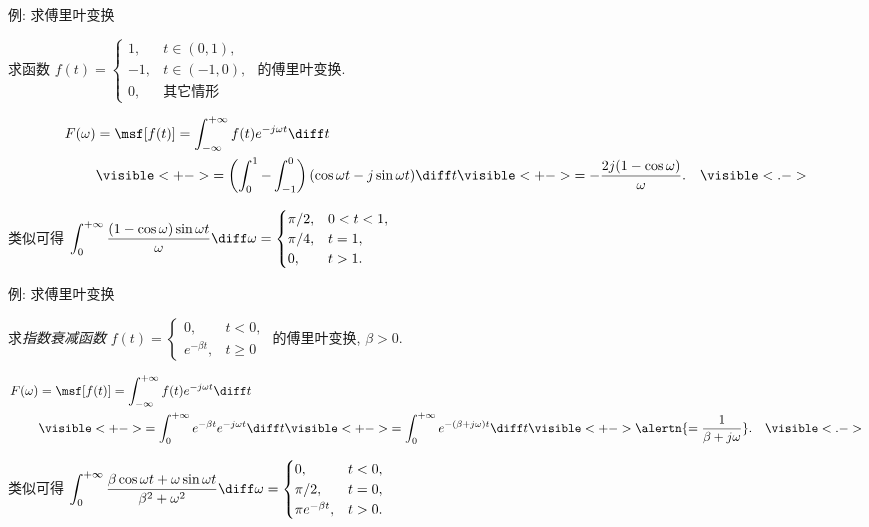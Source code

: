 \begin{frame}{例: 求傅里叶变换}
	\onslide<+->
	\begin{example}
		求函数 $f(t)=
			\begin{cases}
				1,&t\in(0,1),\\
				-1,&t\in(-1,0),\\
				0,&\text{其它情形}
			\end{cases}$
		的傅里叶变换.
	\end{example}

	\onslide<+->
	\begin{solution}
		\vspace{-\baselineskip}
		\begin{align*}
			F(\omega)&=\msf[f(t)]=\int_{-\infty}^{+\infty}f(t)e^{-j\omega t}\diff t\\
			&\visible<+->{=\left(\int_0^1-\int_{-1}^0\right)(\cos\omega t-j\sin\omega t)\diff t}
			\visible<+->{=-\frac{2j(1-\cos\omega)}\omega.}&\visible<.->{}
		\end{align*}
	\end{solution}

	\onslide<+->
	类似可得
	$\displaystyle\int_0^{+\infty}\frac{(1-\cos\omega)\sin\omega t}\omega\diff\omega=
		\begin{cases}
			\pi/2,&0<t<1,\\
			\pi/4,&t=1,\\
			0,&t>1.
		\end{cases}$
\end{frame}


\begin{frame}{例: 求傅里叶变换}
	\onslide<+->
	\begin{example}
		求\emph{指数衰减函数} $f(t)=
			\begin{cases}
				0,&t<0,\\
				e^{-\beta t},&t\ge 0
			\end{cases}$ 的傅里叶变换, $\beta>0$.
	\end{example}

	\onslide<+->
	\begin{solution}
		\vspace{-\baselineskip}
		\begin{align*}
			F(\omega)&=\msf[f(t)]=\int_{-\infty}^{+\infty}f(t)e^{-j\omega t}\diff t\\
			&\visible<+->{=\int_0^{+\infty}e^{-\beta t}e^{-j\omega t}\diff t}
			\visible<+->{=\int_0^{+\infty}e^{-(\beta+j\omega)t}\diff t}
			\visible<+->{\alertn{=\frac1{\beta+j\omega}}.}&\visible<.->{}
		\end{align*}
	\end{solution}

	\onslide<+->
	类似可得
	$\displaystyle\int_0^{+\infty}\frac{\beta\cos\omega t+\omega\sin\omega t}{\beta^2+\omega^2}\diff\omega=
		\begin{cases}
			0,&t<0,\\
			\pi/2,&t=0,\\
			\pi e^{-\beta t},&t>0.
		\end{cases}$
\end{frame}


